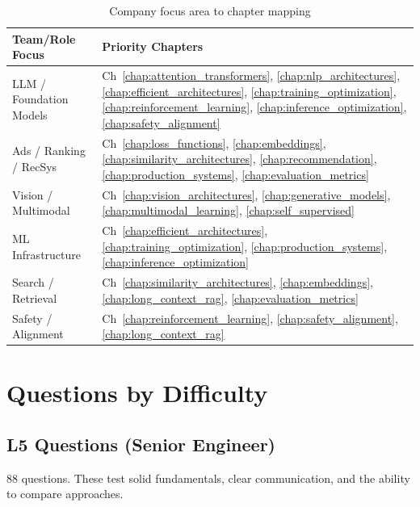 \begin{table}[H]
\centering
\caption{Company focus area to chapter mapping}
\begin{tabularx}{\textwidth}{lX}
\toprule
\textbf{Team/Role Focus} & \textbf{Priority Chapters} \\
\midrule
LLM / Foundation Models & Ch~\ref{chap:attention_transformers}, \ref{chap:nlp_architectures}, \ref{chap:efficient_architectures}, \ref{chap:training_optimization}, \ref{chap:reinforcement_learning}, \ref{chap:inference_optimization}, \ref{chap:safety_alignment} \\
Ads / Ranking / RecSys & Ch~\ref{chap:loss_functions}, \ref{chap:embeddings}, \ref{chap:similarity_architectures}, \ref{chap:recommendation}, \ref{chap:production_systems}, \ref{chap:evaluation_metrics} \\
Vision / Multimodal & Ch~\ref{chap:vision_architectures}, \ref{chap:generative_models}, \ref{chap:multimodal_learning}, \ref{chap:self_supervised} \\
ML Infrastructure & Ch~\ref{chap:efficient_architectures}, \ref{chap:training_optimization}, \ref{chap:production_systems}, \ref{chap:inference_optimization} \\
Search / Retrieval & Ch~\ref{chap:similarity_architectures}, \ref{chap:embeddings}, \ref{chap:long_context_rag}, \ref{chap:evaluation_metrics} \\
Safety / Alignment & Ch~\ref{chap:reinforcement_learning}, \ref{chap:safety_alignment}, \ref{chap:long_context_rag} \\
\bottomrule
\end{tabularx}
\end{table}

\section{Questions by Difficulty}
\label{sec:qi_by_difficulty}

\subsection{L5 Questions (Senior Engineer)}

88 questions. These test solid fundamentals, clear communication, and the ability to compare approaches.

